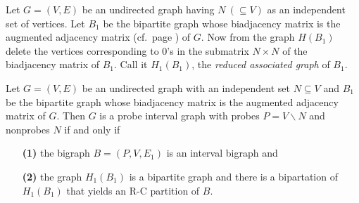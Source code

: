 \documentclass[secthm]{elsart}
\begin{document}
Let $G=(V,E)$ be an undirected graph having $N\ (\subseteq V)$ as an independent set of vertices. Let $B_1$ be the bipartite graph whose biadjacency matrix is the augmented adjacency matrix (cf.~page \pageref{'augmented'}) of $G$. Now from the graph $H(B_1)$ delete the vertices corresponding to $0$'s in the submatrix $N\times N$ of the biadjacency matrix of $B_1$. Call it $H_1(B_1)$, the {\em reduced associated graph} of $B_1$.

\begin{thm}\label{t:char2}
Let $G=(V,E)$ be an undirected graph with an independent set $N\subseteq V$ and $B_1$ be the bipartite graph whose biadjacency matrix is the augmented adjacency matrix of $G$. Then $G$ is a probe interval graph with probes $P=V\smallsetminus N$ and nonprobes $N$ if and only if 
\begin{enumerate}
\item[{\bf (1)}] the bigraph $B=(P,V,E_1)$ is an interval bigraph and
\item[{\bf (2)}] the graph $H_1(B_1)$ is a bipartite graph and there is a bipartation of $H_1(B_1)$ that yields an R-C partition of $B$. 
\end{enumerate}
\end{thm}
\end{document}
